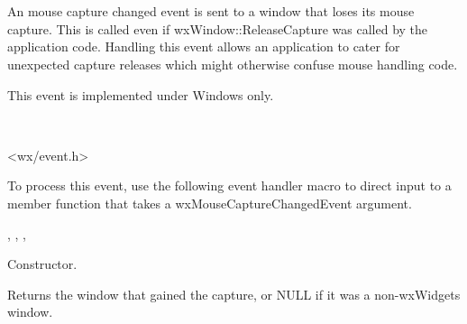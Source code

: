 \section{}\label{wxmousecapturechangedevent}

An mouse capture changed event is sent to a window that loses its
mouse capture. This is called even if wxWindow::ReleaseCapture
was called by the application code. Handling this event allows
an application to cater for unexpected capture releases which
might otherwise confuse mouse handling code.

This event is implemented under Windows only.


\\


<wx/event.h>


To process this event, use the following event handler macro to direct input to a member
function that takes a wxMouseCaptureChangedEvent argument.

\twocolwidtha{7cm}
\begin{twocollist}\itemsep=0pt
\end{twocollist}


, 
, 
, 




Constructor.

\label{wxmousecapturechangedeventgetcapturedwindow}


Returns the window that gained the capture, or NULL if it was a non-wxWidgets window.

